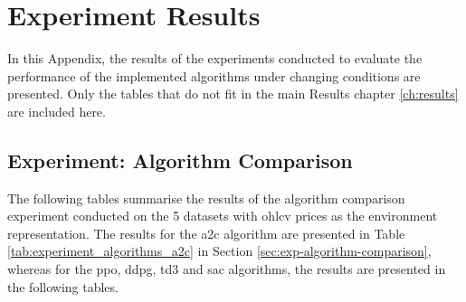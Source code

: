 \chapter{Experiment Results}

In this Appendix, the results of the experiments conducted to evaluate the performance of the implemented algorithms under changing conditions are presented. Only the tables that do not fit in the main Results chapter \ref{ch:results} are included here.

\section{Experiment: Algorithm Comparison} \label{app:experiment_algorithms_comparison}

The following tables summarise the results of the algorithm comparison experiment conducted on the 5 datasets with \acrshort{ohlcv} prices as the environment representation. The results for the \acrshort{a2c} algorithm are presented in Table \ref{tab:experiment_algorithms_a2c} in Section \ref{sec:exp-algorithm-comparison}, whereas for the \acrshort{ppo}, \acrshort{ddpg}, \acrshort{td3} and \acrshort{sac} algorithms, the results are presented in the following tables. 

% 

% 

% 

% 
